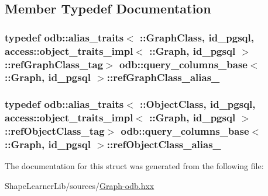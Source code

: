 \subsection{Member Typedef Documentation}
\hypertarget{structodb_1_1query__columns__base_3_01_1_1_graph_00_01id__pgsql_01_4_a4306d56e8c22637d01aec76fb2662416}{}
\subsubsection[{ref\+Graph\+Class\+\_\+alias\+\_\+}]{\setlength{\rightskip}{0pt plus 5cm}typedef odb\+::alias\+\_\+traits$<$ \+::{\bf Graph\+Class}, id\+\_\+pgsql, access\+::object\+\_\+traits\+\_\+impl$<$ \+::{\bf Graph}, id\+\_\+pgsql $>$\+::ref\+Graph\+Class\+\_\+tag$>$ odb\+::query\+\_\+columns\+\_\+base$<$ \+::{\bf Graph}, id\+\_\+pgsql $>$\+::{\bf ref\+Graph\+Class\+\_\+alias\+\_\+}}\label{structodb_1_1query__columns__base_3_01_1_1_graph_00_01id__pgsql_01_4_a4306d56e8c22637d01aec76fb2662416}
\hypertarget{structodb_1_1query__columns__base_3_01_1_1_graph_00_01id__pgsql_01_4_ab9ee301664ba12da094e2866ff789e53}{}
\subsubsection[{ref\+Object\+Class\+\_\+alias\+\_\+}]{\setlength{\rightskip}{0pt plus 5cm}typedef odb\+::alias\+\_\+traits$<$ \+::{\bf Object\+Class}, id\+\_\+pgsql, access\+::object\+\_\+traits\+\_\+impl$<$ \+::{\bf Graph}, id\+\_\+pgsql $>$\+::ref\+Object\+Class\+\_\+tag$>$ odb\+::query\+\_\+columns\+\_\+base$<$ \+::{\bf Graph}, id\+\_\+pgsql $>$\+::{\bf ref\+Object\+Class\+\_\+alias\+\_\+}}\label{structodb_1_1query__columns__base_3_01_1_1_graph_00_01id__pgsql_01_4_ab9ee301664ba12da094e2866ff789e53}


The documentation for this struct was generated from the following file\+:\begin{DoxyCompactItemize}
\item 
Shape\+Learner\+Lib/sources/\hyperlink{_graph-odb_8hxx}{Graph-\/odb.\+hxx}\end{DoxyCompactItemize}
